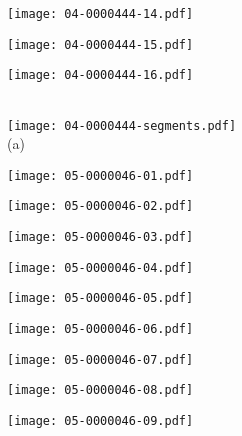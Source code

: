 \documentclass[10pt,twocolumn,letterpaper]{article}
\begin{document}
\begin{figure*}[t]
 \begin{minipage}{0.058\textwidth} \centering \texttt{[image: 04-0000444-14.pdf]} \end{minipage}
 \begin{minipage}{0.058\textwidth} \centering \texttt{[image: 04-0000444-15.pdf]} \end{minipage}
 \begin{minipage}{0.058\textwidth} \centering \texttt{[image: 04-0000444-16.pdf]} \end{minipage}
 \\ \vspace{2mm}
 \texttt{[image: 04-0000444-segments.pdf]}
 \\
 (a)
 \\ \vspace{2mm}
 \begin{minipage}{0.058\textwidth} \centering \texttt{[image: 05-0000046-01.pdf]} \end{minipage}
 \begin{minipage}{0.058\textwidth} \centering \texttt{[image: 05-0000046-02.pdf]} \end{minipage}
 \begin{minipage}{0.058\textwidth} \centering \texttt{[image: 05-0000046-03.pdf]} \end{minipage}
 \begin{minipage}{0.058\textwidth} \centering \texttt{[image: 05-0000046-04.pdf]} \end{minipage}
 \begin{minipage}{0.058\textwidth} \centering \texttt{[image: 05-0000046-05.pdf]} \end{minipage}
 \begin{minipage}{0.058\textwidth} \centering \texttt{[image: 05-0000046-06.pdf]} \end{minipage}
 \begin{minipage}{0.058\textwidth} \centering \texttt{[image: 05-0000046-07.pdf]} \end{minipage}
 \begin{minipage}{0.058\textwidth} \centering \texttt{[image: 05-0000046-08.pdf]} \end{minipage}
 \begin{minipage}{0.058\textwidth} \centering \texttt{[image: 05-0000046-09.pdf]} \end{minipage}

\end{figure*}
\end{document}
